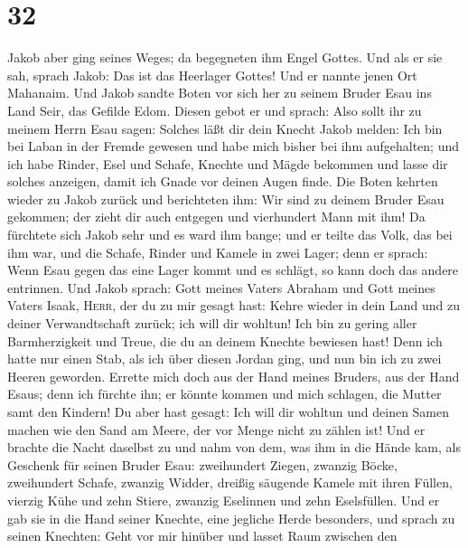 \hypertarget{section-31}{%
\section{32}\label{section-31}}

 Jakob aber ging seines Weges; da begegneten ihm Engel
Gottes.  Und als er sie sah, sprach Jakob: Das ist das
Heerlager Gottes! Und er nannte jenen Ort Mahanaim.  Und
Jakob sandte Boten vor sich her zu seinem Bruder Esau ins Land Seir, das
Gefilde Edom.  Diesen gebot er und sprach: Also sollt ihr
zu meinem Herrn Esau sagen: Solches läßt dir dein Knecht Jakob melden:
Ich bin bei Laban in der Fremde gewesen und habe mich bisher bei ihm
aufgehalten;  und ich habe Rinder, Esel und Schafe,
Knechte und Mägde bekommen und lasse dir solches anzeigen, damit ich
Gnade vor deinen Augen finde.  Die Boten kehrten wieder zu
Jakob zurück und berichteten ihm: Wir sind zu deinem Bruder Esau
gekommen; der zieht dir auch entgegen und vierhundert Mann mit ihm!
 Da fürchtete sich Jakob sehr und es ward ihm bange; und
er teilte das Volk, das bei ihm war, und die Schafe, Rinder und Kamele
in zwei Lager;  denn er sprach: Wenn Esau gegen das eine
Lager kommt und es schlägt, so kann doch das andere entrinnen.
 Und Jakob sprach: Gott meines Vaters Abraham und Gott
meines Vaters Isaak, \textsc{Herr}, der du zu mir gesagt hast: Kehre
wieder in dein Land und zu deiner Verwandtschaft zurück; ich will dir
wohltun!  Ich bin zu gering aller Barmherzigkeit und
Treue, die du an deinem Knechte bewiesen hast! Denn ich hatte nur einen
Stab, als ich über diesen Jordan ging, und nun bin ich zu zwei Heeren
geworden.  Errette mich doch aus der Hand meines Bruders,
aus der Hand Esaus; denn ich fürchte ihn; er könnte kommen und mich
schlagen, die Mutter samt den Kindern!  Du aber hast
gesagt: Ich will dir wohltun und deinen Samen machen wie den Sand am
Meere, der vor Menge nicht zu zählen ist!  Und er brachte
die Nacht daselbst zu und nahm von dem, was ihm in die Hände kam, als
Geschenk für seinen Bruder Esau:  zweihundert Ziegen,
zwanzig Böcke, zweihundert Schafe, zwanzig Widder, 
dreißig säugende Kamele mit ihren Füllen, vierzig Kühe und zehn Stiere,
zwanzig Eselinnen und zehn Eselsfüllen.  Und er gab sie
in die Hand seiner Knechte, eine jegliche Herde besonders, und sprach zu
seinen Knechten: Geht vor mir hinüber und lasset Raum zwischen den
